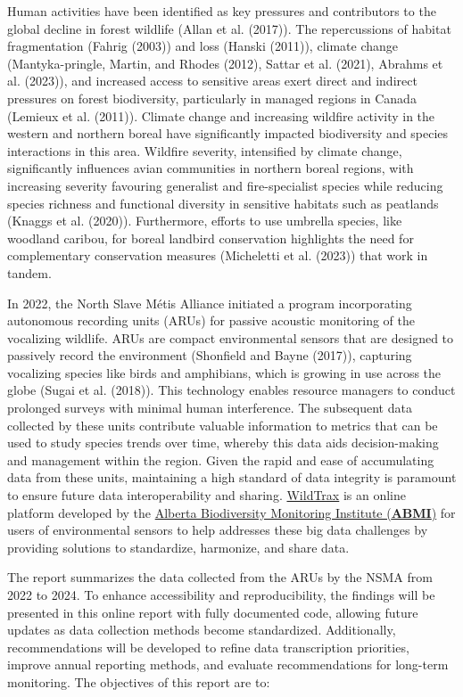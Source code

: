 \documentclass[
  letterpaper,
  DIV=11,
  numbers=noendperiod,
  oneside]{scrartcl}
\begin{document}
Human activities have been identified as key pressures and contributors
to the global decline in forest wildlife (Allan et al. (2017)). The
repercussions of habitat fragmentation (Fahrig (2003)) and loss (Hanski
(2011)), climate change (Mantyka-pringle, Martin, and Rhodes (2012),
Sattar et al. (2021), Abrahms et al. (2023)), and increased access to
sensitive areas exert direct and indirect pressures on forest
biodiversity, particularly in managed regions in Canada (Lemieux et al.
(2011)). Climate change and increasing wildfire activity in the western
and northern boreal have significantly impacted biodiversity and species
interactions in this area. Wildfire severity, intensified by climate
change, significantly influences avian communities in northern boreal
regions, with increasing severity favouring generalist and
fire-specialist species while reducing species richness and functional
diversity in sensitive habitats such as peatlands (Knaggs et al.
(2020)). Furthermore, efforts to use umbrella species, like woodland
caribou, for boreal landbird conservation highlights the need for
complementary conservation measures (Micheletti et al. (2023)) that work
in tandem.

In 2022, the North Slave Métis Alliance initiated a program
incorporating autonomous recording units (ARUs) for passive acoustic
monitoring of the vocalizing wildlife. ARUs are compact environmental
sensors that are designed to passively record the environment (Shonfield
and Bayne (2017)), capturing vocalizing species like birds and
amphibians, which is growing in use across the globe (Sugai et al.
(2018)). This technology enables resource managers to conduct prolonged
surveys with minimal human interference. The subsequent data collected
by these units contribute valuable information to metrics that can be
used to study species trends over time, whereby this data aids
decision-making and management within the region. Given the rapid and
ease of accumulating data from these units, maintaining a high standard
of data integrity is paramount to ensure future data interoperability
and sharing. \href{https://www.wildtrax.ca}{WildTrax} is an online
platform developed by the \href{https://abmi.ca}{Alberta Biodiversity
Monitoring Institute (\textbf{ABMI})} for users of environmental sensors
to help addresses these big data challenges by providing solutions to
standardize, harmonize, and share data.

The report summarizes the data collected from the ARUs by the NSMA from
2022 to 2024. To enhance accessibility and reproducibility, the findings
will be presented in this online report with fully documented code,
allowing future updates as data collection methods become standardized.
Additionally, recommendations will be developed to refine data
transcription priorities, improve annual reporting methods, and evaluate
recommendations for long-term monitoring. The objectives of this report
are to:
\end{document}
